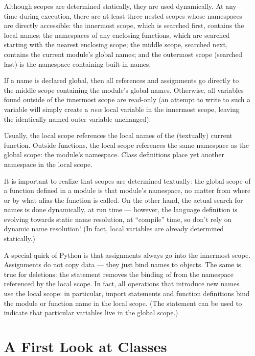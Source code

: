 \documentclass{manual}
\begin{document}
Although scopes are determined statically, they are used dynamically.
At any time during execution, there are at least three nested scopes whose
namespaces are directly accessible: the innermost scope, which is searched
first, contains the local names; the namespaces of any enclosing
functions, which are searched starting with the nearest enclosing scope;
the middle scope, searched next, contains the current module's global names;
and the outermost scope (searched last) is the namespace containing built-in
names.

If a name is declared global, then all references and assignments go
directly to the middle scope containing the module's global names.
Otherwise, all variables found outside of the innermost scope are read-only
(an attempt to write to such a variable will simply create a \emph{new}
local variable in the innermost scope, leaving the identically named
outer variable unchanged).

Usually, the local scope references the local names of the (textually)
current function.  Outside functions, the local scope references
the same namespace as the global scope: the module's namespace.
Class definitions place yet another namespace in the local scope.

It is important to realize that scopes are determined textually: the
global scope of a function defined in a module is that module's
namespace, no matter from where or by what alias the function is
called.  On the other hand, the actual search for names is done
dynamically, at run time --- however, the language definition is
evolving towards static name resolution, at ``compile'' time, so don't
rely on dynamic name resolution!  (In fact, local variables are
already determined statically.)

A special quirk of Python is that assignments always go into the
innermost scope.  Assignments do not copy data --- they just
bind names to objects.  The same is true for deletions: the statement
 removes the binding of  from the namespace
referenced by the local scope.  In fact, all operations that introduce
new names use the local scope: in particular, import statements and
function definitions bind the module or function name in the local
scope.  (The  statement can be used to indicate that
particular variables live in the global scope.)


\section{A First Look at Classes \label{firstClasses}}
\end{document}
